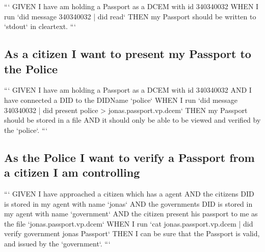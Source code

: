 ```
GIVEN I have am holding a Passport as a DCEM with id 340340032
WHEN  I run `did message 340340032 | did read`
THEN  my Passport should be written to `stdout` in cleartext.
```

\subsection{As a citizen I want to present my Passport to the Police}

```
GIVEN I have am holding a Passport as a DCEM with id 340340032
AND   I have connected a DID to the DIDName `police`
WHEN  I run `did message 340340032 | did present police > jonas.passport.vp.dcem`
THEN  my Passport should be stored in a file
AND   it should only be able to be viewed and verified by the `police`.
```

\subsection{As the Police I want to verify a Passport from a citizen I am controlling}

```
GIVEN I have approached a citizen which has a agent
AND   the citizens DID is stored in my agent with name `jonas`
AND   the governments DID is stored in my agent with name `government`
AND   the citizen present his passport to me as the file `jonas.passport.vp.dcem`
WHEN  I run `cat jonas.passport.vp.dcem | did verify government jonas Passport`
THEN  I can be sure that the Passport is valid, and issued by the `government`.
```
